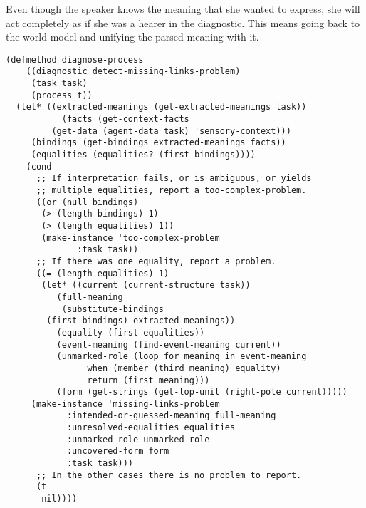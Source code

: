 Even though the speaker knows the meaning that she wanted to express, she will act completely as if she was a hearer in the diagnostic. This means going back to the world model and unifying the parsed meaning with it.

\begin{verbatim}
(defmethod diagnose-process 
    ((diagnostic detect-missing-links-problem)
     (task task)
     (process t))
  (let* ((extracted-meanings (get-extracted-meanings task))
           (facts (get-context-facts
		 (get-data (agent-data task) 'sensory-context)))
	 (bindings (get-bindings extracted-meanings facts))
	 (equalities (equalities? (first bindings))))
    (cond
      ;; If interpretation fails, or is ambiguous, or yields
      ;; multiple equalities, report a too-complex-problem.
      ((or (null bindings)
	   (> (length bindings) 1)
	   (> (length equalities) 1))
       (make-instance 'too-complex-problem
		      :task task))
      ;; If there was one equality, report a problem.
      ((= (length equalities) 1)
       (let* ((current (current-structure task))
	      (full-meaning 
	       (substitute-bindings 
		(first bindings) extracted-meanings))
	      (equality (first equalities))
	      (event-meaning (find-event-meaning current))
	      (unmarked-role (loop for meaning in event-meaning
				when (member (third meaning) equality)
				return (first meaning)))
	      (form (get-strings (get-top-unit (right-pole current)))))
	 (make-instance 'missing-links-problem
			:intended-or-guessed-meaning full-meaning
			:unresolved-equalities equalities
			:unmarked-role unmarked-role
			:uncovered-form form
			:task task)))
      ;; In the other cases there is no problem to report.
      (t
       nil))))
\end{verbatim}